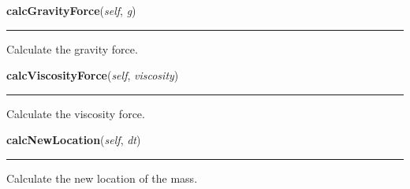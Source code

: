     \label{Epigrass:dgraph:Node:calcGravityForce}

    \vspace{0.5ex}

    \begin{boxedminipage}{\textwidth}

    \raggedright \textbf{calcGravityForce}(\textit{self}, \textit{g})

    \vspace{-1.5ex}

    \rule{\textwidth}{0.5\fboxrule}
    Calculate the gravity force.

    \vspace{1ex}

    \end{boxedminipage}

    \label{Epigrass:dgraph:Node:calcViscosityForce}

    \vspace{0.5ex}

    \begin{boxedminipage}{\textwidth}

    \raggedright \textbf{calcViscosityForce}(\textit{self}, \textit{viscosity})

    \vspace{-1.5ex}

    \rule{\textwidth}{0.5\fboxrule}
    Calculate the viscosity force.

    \vspace{1ex}

    \end{boxedminipage}

    \label{Epigrass:dgraph:Node:calcNewLocation}

    \vspace{0.5ex}

    \begin{boxedminipage}{\textwidth}

    \raggedright \textbf{calcNewLocation}(\textit{self}, \textit{dt})

    \vspace{-1.5ex}

    \rule{\textwidth}{0.5\fboxrule}
    Calculate the new location of the mass.

    \vspace{1ex}

    \end{boxedminipage}

